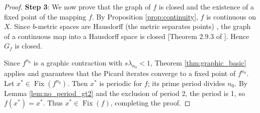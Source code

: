 \documentclass[a4paper,12pt,oneside]{article}
\numberwithin{equation}{section}
\begin{document}
\begin{proof}
\textbf{Step 3}: We now prove that  the graph of $f$ is closed and the existence of a fixed point of the mapping $f$. By Proposition \ref{prop:continuity}, $f$ is continuous on $X$. Since $b$-metric spaces are Hausdorff (the metric separates points) \cite{Kunzi2022}, the graph of a continuous map into a Hausdorff space is closed [Theorem 2.9.3 of \cite{malkowsky2019}]. Hence $G_f$ is closed.

Since $f^{n_0}$ is a graphic contraction with $s\lambda_{n_0}<1$, Theorem \ref{thm:graphic_basic} applies and guarantees that the Picard iterates converge to a fixed point of $f^{n_0}$. Let $x^*\in \operatorname{Fix}(f^{n_0})$. Then $x^*$ is periodic for $f$; its prime period divides $n_0$. By Lemma \ref{lem:no_period_gt2} and the exclusion of period 2, the period is 1, so $f(x^*)=x^*$. Thus $x^*\in \operatorname{Fix}(f)$, completing the proof.
\end{proof}
\end{document}
